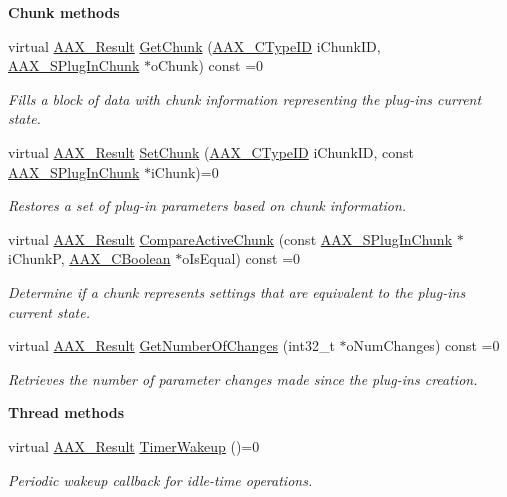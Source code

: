 \begin{Indent}{\bf Chunk methods}
\begin{DoxyCompactItemize}
virtual \hyperlink{a00149_a4d8f69a697df7f70c3a8e9b8ee130d2f}{A\+A\+X\+\_\+\+Result} \hyperlink{a00061_ab977041a440a9cd6f3e631c059ee8b99}{Get\+Chunk} (\hyperlink{a00149_ac678f9c1fbcc26315d209f71a147a175}{A\+A\+X\+\_\+\+C\+Type\+I\+D} i\+Chunk\+I\+D, \hyperlink{a00125}{A\+A\+X\+\_\+\+S\+Plug\+In\+Chunk} $\ast$o\+Chunk) const =0
\begin{DoxyCompactList}\small\item\em Fills a block of data with chunk information representing the plug-\/in\textquotesingle{}s current state. \end{DoxyCompactList}\item 
virtual \hyperlink{a00149_a4d8f69a697df7f70c3a8e9b8ee130d2f}{A\+A\+X\+\_\+\+Result} \hyperlink{a00061_a2d780ebc594683e24302871b809602e8}{Set\+Chunk} (\hyperlink{a00149_ac678f9c1fbcc26315d209f71a147a175}{A\+A\+X\+\_\+\+C\+Type\+I\+D} i\+Chunk\+I\+D, const \hyperlink{a00125}{A\+A\+X\+\_\+\+S\+Plug\+In\+Chunk} $\ast$i\+Chunk)=0
\begin{DoxyCompactList}\small\item\em Restores a set of plug-\/in parameters based on chunk information. \end{DoxyCompactList}\item 
virtual \hyperlink{a00149_a4d8f69a697df7f70c3a8e9b8ee130d2f}{A\+A\+X\+\_\+\+Result} \hyperlink{a00061_a1e86f849e970c9998313fc7d451ccf85}{Compare\+Active\+Chunk} (const \hyperlink{a00125}{A\+A\+X\+\_\+\+S\+Plug\+In\+Chunk} $\ast$i\+Chunk\+P, \hyperlink{a00149_aa216506530f1d19a2965931ced2b274b}{A\+A\+X\+\_\+\+C\+Boolean} $\ast$o\+Is\+Equal) const =0
\begin{DoxyCompactList}\small\item\em Determine if a chunk represents settings that are equivalent to the plug-\/in\textquotesingle{}s current state. \end{DoxyCompactList}\item 
virtual \hyperlink{a00149_a4d8f69a697df7f70c3a8e9b8ee130d2f}{A\+A\+X\+\_\+\+Result} \hyperlink{a00061_a17b96da201d9a242d3662e87525a7227}{Get\+Number\+Of\+Changes} (int32\+\_\+t $\ast$o\+Num\+Changes) const =0
\begin{DoxyCompactList}\small\item\em Retrieves the number of parameter changes made since the plug-\/in\textquotesingle{}s creation. \end{DoxyCompactList}\end{DoxyCompactItemize}
\end{Indent}
\begin{Indent}{\bf Thread methods}\par
\begin{DoxyCompactItemize}
\item 
virtual \hyperlink{a00149_a4d8f69a697df7f70c3a8e9b8ee130d2f}{A\+A\+X\+\_\+\+Result} \hyperlink{a00061_ab5b8da9e1a9d778d327ac04f4ab8d139}{Timer\+Wakeup} ()=0
\begin{DoxyCompactList}\small\item\em Periodic wakeup callback for idle-\/time operations. \end{DoxyCompactList}\end{DoxyCompactItemize}
\end{Indent}
